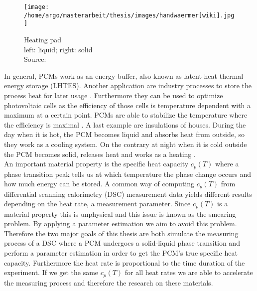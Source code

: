 \documentclass{scrartcl}[12pt, halfparskip]
\numberwithin{equation}{section}
\numberwithin{figure}{section}
\numberwithin{table}{section}
\begin{document}
\begin{wrapfigure}{l}{0.43\textwidth}
	\texttt{[image: /home/argo/masterarbeit/thesis/images/handwaermer[wiki].jpg]}
	\caption{Heating pad \\ left: liquid; right: solid \\
		Source: \cite{heating_pad_image}}
	\label{fig:heating_pad}
\end{wrapfigure}


In general, PCMs work as an energy buffer, also known as  latent heat thermal energy storage (LHTES). Another application are industry processes to store the process heat for later usage \cite{pcm_process_heat}. Furthermore they can be used to optimize  photovoltaic cells as the efficiency of those cells is temperature dependent with a maximum at a certain point. PCMs are able to stabilize the temperature where the efficiency is maximal \cite{pcm_solar_cells}. 
A last example are insulations of houses. During the day when it is hot, the PCM becomes liquid and absorbs heat from outside, so they work as a cooling system. On the contrary at night when it is cold outside the PCM becomes solid, releases heat and works as a heating \cite{pcm_house_insulation}. \\
An important material property is the specific heat capacity $c_p(T)$ where a phase transition peak tells us at which temperature the phase change occurs and how much energy can be stored. A common way of computing $c_p(T)$ from differential scanning calorimetry (DSC) measurement data yields different results depending on the heat rate, a measurement parameter. Since $c_p(T)$ is a material property this is unphysical and this issue is known as the smearing problem. By applying a parameter estimation we aim to avoid this problem.
Therefore the two major goals of this thesis are both simulate the measuring process of a DSC where a PCM undergoes a solid-liquid phase transition and perform a parameter estimation in order to get the PCM's true specific heat capacity. 
Furthermore the heat rate is proportional to the time duration of the experiment. If we get the same $c_p(T)$ for all heat rates we are able to accelerate the measuring process and therefore the research on these materials.
\end{document}
